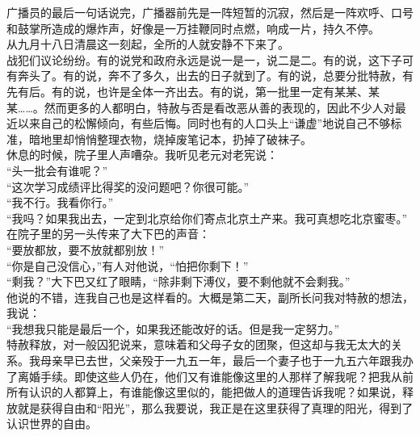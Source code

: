 广播员的最后一句话说完，广播器前先是一阵短暂的沉寂，然后是一阵欢呼、口号和鼓掌所造成的爆炸声，好像是一万挂鞭同时点燃，响成一片，持久不停。\\

从九月十八日清晨这一刻起，全所的人就安静不下来了。\\

战犯们议论纷纷。有的说党和政府永远是说一是一，说二是二。有的说，这下子可有奔头了。有的说，奔不了多久，出去的日子就到了。有的说，总要分批特赦，有先有后。有的说，也许是全体一齐出去。有的说，第一批里一定有某某、某某……。然而更多的人都明白，特赦与否是看改恶从善的表现的，因此不少人对最近以来自己的松懈倾向，有些后悔。同时也有的人口头上“谦虚”地说自己不够标准，暗地里却悄悄整理衣物，烧掉废笔记本，扔掉了破袜子。\\

休息的时候，院子里人声嘈杂。我听见老元对老宪说：\\

“头一批会有谁呢？”\\

“这次学习成绩评比得奖的没问题吧？你很可能。”\\

“我不行。我看你行。”\\

“我吗？如果我出去，一定到北京给你们寄点北京土产来。我可真想吃北京蜜枣。”\\

在院子里的另一头传来了大下巴的声音：\\

“要放都放，要不放就都别放！”\\

“你是自己没信心，”有人对他说，“怕把你剩下！”\\

“剩我？”大下巴又红了眼睛，“除非剩下溥仪，要不剩他就不会剩我。”\\

他说的不错，连我自己也是这样看的。大概是第二天，副所长问我对特赦的想法，我说：\\

“我想我只能是最后一个，如果我还能改好的话。但是我一定努力。”\\

特赦释放，对一般囚犯说来，意味着和父母子女的团聚，但这却与我无太大的关系。我母亲早已去世，父亲殁于一九五一年，最后一个妻子也于一九五六年跟我办了离婚手续。即使这些人仍在，他们又有谁能像这里的人那样了解我呢？把我从前所有认识的人都算上，有谁能像这里似的，能把做人的道理告诉我呢？如果说，释放就是获得自由和“阳光”，那么我要说，我正是在这里获得了真理的阳光，得到了认识世界的自由。\\


